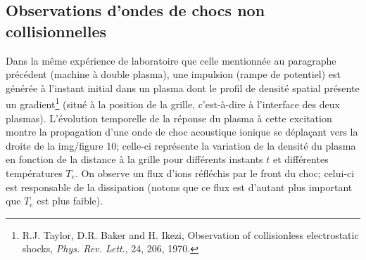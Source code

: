 \documentclass[10pt,thmsa]{article}
\begin{document}
\subsection{Observations d'ondes de chocs non collisionnelles}

Dans la m\^{e}me exp\'{e}rience de laboratoire que celle mentionn\'{e}e au
paragraphe pr\'{e}c\'{e}dent (machine \`{a} double plasma), une impulsion
(rampe de potentiel) est g\'{e}n\'{e}r\'{e}e \`{a} l'instant initial dans un
plasma dont le profil de densit\'{e} spatial pr\'{e}sente un
gradient\footnote{R.J. Taylor, D.R. Baker and H. Ikezi, Observation of
collisionless electrostatic shocks, \textit{Phys. Rev. Lett}., 24, 206, 1970.}
(situ\'{e} \`{a} la position de la grille, c'est-\`{a}-dire \`{a} l'interface
des deux plasmas). L'\'{e}volution temporelle de la r\'{e}ponse du plasma
\`{a} cette excitation montre la propagation d'une onde de choc acoustique
ionique se d\'{e}pla\c{c}ant vers la droite de la img/figure 10; celle-ci
repr\'{e}sente la variation de la densit\'{e} du plasma en fonction de la
distance \`{a} la grille pour diff\'{e}rents instants $t$ et diff\'{e}rentes
temp\'{e}ratures $T_{e}.$ On observe un flux d'ions r\'{e}fl\'{e}chis par le
front du choc; celui-ci est responsable de la dissipation (notons que ce flux
est d'autant plus important que $T_{e}$ est plus faible).%
\end{document}
